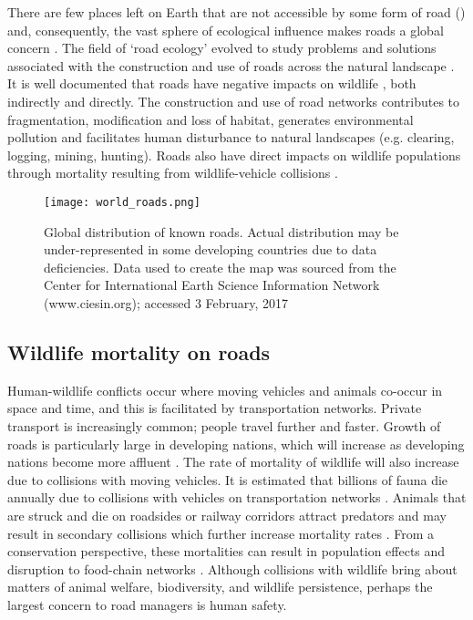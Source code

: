 There are few places left on Earth that are not accessible by some form of road () and, consequently, the vast sphere of ecological influence makes roads a global concern \citep{laur14}. The field of `road ecology' evolved to study problems and solutions associated with the construction and use of roads across the natural landscape \citep[see][]{form03}. It is well documented that roads have negative impacts on wildlife \citep{form98,spel98,rvdr15}, both indirectly and directly. The construction and use of road networks contributes to fragmentation, modification and loss of habitat, generates environmental pollution and facilitates human disturbance to natural landscapes (e.g. clearing, logging, mining, hunting). Roads also have direct impacts on wildlife populations through mortality resulting from wildlife-vehicle collisions \citep{fahr09}.

\begin{figure*}[!t]
  \centering
  \texttt{[image: world\_roads.png]}
  \caption[Global distribution of known roads]{Global distribution of known roads. Actual distribution may be under-represented in some developing countries due to data deficiencies. Data used to create the map was sourced from the Center for International Earth Science Information Network (www.ciesin.org); accessed 3 February, 2017}
  \label{roads}
\end{figure*}

\subsection{Wildlife mortality on roads}

Human-wildlife conflicts occur where moving vehicles and animals co-occur in space and time, and this is facilitated by transportation networks. Private transport is increasingly common; people travel further and faster. Growth of roads is particularly large in developing nations, which will increase as developing nations become more affluent \citep{rvdr15}. The rate of mortality of wildlife will also increase due to collisions with moving vehicles. It is estimated that billions of fauna die annually due to collisions with vehicles on transportation networks \citep{seil06}. Animals that are struck and die on roadsides or railway corridors attract predators and may result in secondary collisions which further increase mortality rates \citep{spel98}. From a conservation perspective, these mortalities can result in population effects and disruption to food-chain networks \citep{ramp06b,cham10,pola14}.  Although collisions with wildlife bring about matters of animal welfare, biodiversity, and wildlife persistence, perhaps the largest concern to road managers is human safety. 

